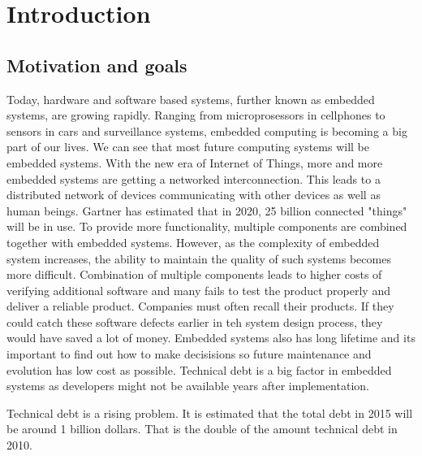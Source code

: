 \chapter{Introduction}

\section{Motivation and goals}




Today, hardware and software based systems, further known as embedded systems, are growing rapidly. Ranging from microprosessors in cellphones to sensors in cars and surveillance systems, embedded computing is becoming a big part of our lives. We can see that most future computing systems will be embedded systems\cite{wolfmadsen-2000}. With the new era of Internet of Things, more and more embedded systems are getting a networked interconnection. This leads to a distributed network of devices communicating with other devices as well as human beings. Gartner has estimated that in 2020, 25 billion connected "things" will be in use\cite{gartner}. To provide more functionality, multiple components are combined together with embedded systems. However, as the complexity of embedded system increases, the ability to maintain the quality of such systems becomes more difficult. Combination of multiple components leads to higher costs of verifying additional software and many fails to test the product properly and deliver a reliable product. Companies must often recall their products. If they could catch these software defects earlier in teh system design process, they would have saved a lot of money. Embedded systems also has long lifetime and its important to find out how to make decisisions so future maintenance and evolution has low cost as possible. Technical debt is a big factor in embedded systems as developers might not be available years after implementation.

Technical debt is a rising problem. It is estimated that the total debt in 2015 will be around 1 billion dollars. That is the double of the amount technical debt in 2010.


